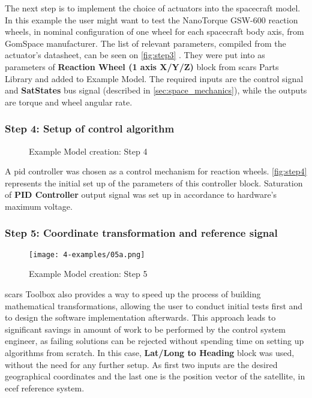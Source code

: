             The next step is to implement the choice of actuators into the spacecraft model. In this example the user might want to test the NanoTorque GSW-600 reaction wheels, in nominal configuration of one wheel for each spacecraft body axis, from GomSpace manufacturer. The list of relevant parameters, compiled from the actuator's datasheet, can be seen on \autoref{fig:step3} . They were put into as parameters of \textbf{Reaction Wheel (1 axis X/Y/Z)} block from \ac{scars} Parts Library and added to Example Model. The required inputs are the control signal and \textbf{SatStates} bus signal (described in \autoref{sec:space_mechanics}), while the outputs are torque and wheel angular rate.

        
        \subsubsection*{Step 4: Setup of control algorithm}
            \begin{figure}[H]
                \centering
                \quad
                \caption{Example Model creation: Step 4}%
                \label{fig:step4}%
            \end{figure}
            A \ac{pid} controller was chosen as a control mechanism for reaction wheels. \autoref{fig:step4}  represents the initial set up of the parameters of this controller block. Saturation of \textbf{PID Controller} output signal was set up in accordance to hardware's maximum voltage.

        \subsubsection*{Step 5: Coordinate transformation and reference signal}
            \begin{figure}[h]
                \centering
                \texttt{[image: 4-examples/05a.png]}
                \caption{Example Model creation: Step 5}
                \label{fig:step5}
            \end{figure}

            \ac{scars} Toolbox also provides a way to speed up the process of building mathematical transformations, allowing the user to conduct initial tests first and to design the software implementation afterwards. This approach leads to significant savings in amount of work to be performed by the control system engineer, as failing solutions can be rejected without spending time on setting up algorithms from scratch. In this case, \textbf{Lat/Long to Heading} block was used, without the need for any further setup. As first two inputs are the desired geographical coordinates and the last one is the position vector of the satellite, in \ac{ecef} reference system.

